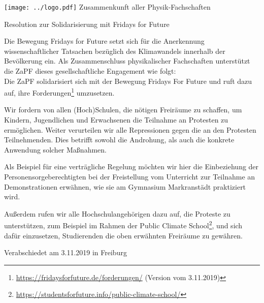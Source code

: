\documentclass[a4paper]{scrartcl}
\begin{document}
\hspace{0.87\textwidth}
\begin{minipage}{120pt}
  \vspace{-1.8cm}
  \texttt{[image: ../logo.pdf]}
  \centering
  \small Zusammenkunft aller Physik-Fachschaften
\end{minipage}
\begin{center}
  \vspace{1cm}
  \huge{Resolution zur Solidarisierung mit Fridays for Future} \\
  \normalsize
\end{center}
\vspace{1cm}

    Die Bewegung Fridays for Future setzt sich für die Anerkennung wissenschaftlicher Tatsachen bezüglich des Klimawandels innerhalb der Bevölkerung ein. Als Zusammenschluss physikalischer Fachschaften unterstützt die ZaPF dieses gesellschaftliche Engagement wie folgt:\\
    Die ZaPF solidarisiert sich mit der Bewegung \glqq{}Fridays For
    Future\grqq{} und ruft dazu auf, ihre Forderungen\footnote{\url{https://fridaysforfuture.de/forderungen/} (Version vom 3.11.2019)} umzusetzen.


    Wir fordern von allen (Hoch)Schulen, die nötigen Freiräume zu schaffen, um \\
    Kindern, Jugendlichen und Erwachsenen die Teilnahme an Protesten zu
    ermöglichen.  Weiter verurteilen wir alle Repressionen gegen die an den
    Protesten Teilnehmenden. Dies betrifft sowohl die Androhung, als auch die
    konkrete Anwendung solcher Maßnahmen.

    Als Beispiel für eine verträgliche
    Regelung möchten wir hier die Einbeziehung der Personensorgeberechtigten
    bei der Freistellung vom Unterricht zur Teilnahme an Demonstrationen
    erwähnen, wie sie am Gymnasium Markranstädt praktiziert wird.

    Außerdem rufen wir alle Hochschulangehörigen dazu auf, die Proteste zu
    unterstützen, zum Beispiel im Rahmen der Public Climate
    School\footnote{\url{https://studentsforfuture.info/public-climate-school/}}, und
    sich dafür einzusetzen, Studierenden die oben erwähnten Freiräume zu
    gewähren.

\vfill
\begin{flushright}
	Verabschiedet am 3.11.2019 in Freiburg
\end{flushright}
\end{document}
